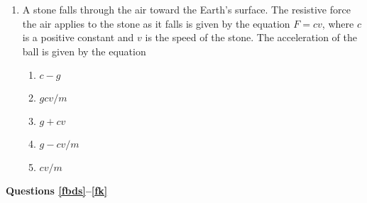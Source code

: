 \documentclass{../../../oss-classkick}
\begin{document}
\begin{multicols*}{2}
\begin{enumerate}[resume,leftmargin=18pt]
  \item A stone falls through the air toward the Earth's surface. The resistive
    force the air applies to the stone as it falls is given by the equation
    $F=cv$, where $c$ is a positive constant and $v$ is the speed of the stone.
    The acceleration of the ball is given by the equation
    \begin{enumerate}[nosep,leftmargin=18pt,label=(\Alph*)]
    \item $c-g$
    \item $gcv/m$
    \item $g+cv$
    \item $g-cv/m$
    \item $cv/m$
    \end{enumerate}
  \end{enumerate}
  
  \textbf{Questions \ref{fbds}--\ref{fk}}


\end{multicols*}
\end{document}
